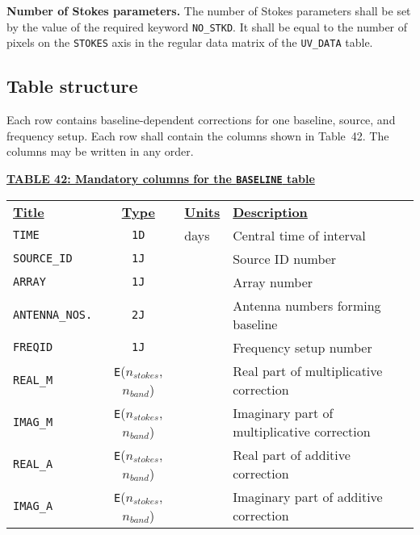 \documentclass[twoside]{article}
\newcommand{\nstokes}{$n_{stokes}$}
\newcommand{\nband}{$n_{band}$}
\begin{document}
{\bf Number of Stokes parameters.}  The number of Stokes parameters
shall be set by the value of the required keyword {\tt NO\_STKD}\@.
It shall be equal to the number of pixels on the {\tt STOKES} axis in
the regular data matrix of the {\tt UV\_DATA} table.

\subsection{Table structure}

Each row contains baseline-dependent corrections for one baseline,
source, and frequency setup.  Each row shall contain the columns shown
in Table~42.  The columns may be written in any order.

\begin{center}
\underline{\bf{TABLE  42: Mandatory columns for the {\tt BASELINE}
    table}}\\
\begin{tabular}{lcll}
\noalign{\vspace{2pt}}
\underline{{\bf Title\vphantom{y}}} & \underline{\bf{Type}} &
   \underline{{\bf Units\vphantom{y}}} & \underline{\bf{Description}} \\
\noalign{\vspace{2pt}}
{\tt TIME}        & {\tt 1D} & days  & Central time of interval \\
{\tt SOURCE\_ID}  & {\tt 1J} &       & Source ID number \\
{\tt ARRAY}       & {\tt 1J} &       & Array number \\
{\tt ANTENNA\_NOS.} & {\tt 2J} &     & Antenna numbers forming baseline \\
{\tt FREQID}      & {\tt 1J} &       & Frequency setup number \\
{\tt REAL\_M}     & {\tt E}(\nstokes,\nband) & & Real part of
                                       multiplicative correction \\
{\tt IMAG\_M}     & {\tt E}(\nstokes,\nband) & & Imaginary part of
                                       multiplicative correction \\
{\tt REAL\_A}     & {\tt E}(\nstokes,\nband) & & Real part of
                                       additive correction \\
{\tt IMAG\_A}     & {\tt E}(\nstokes,\nband) & & Imaginary part of
                                       additive correction \\
\end{tabular}
\end{center}
\end{document}
